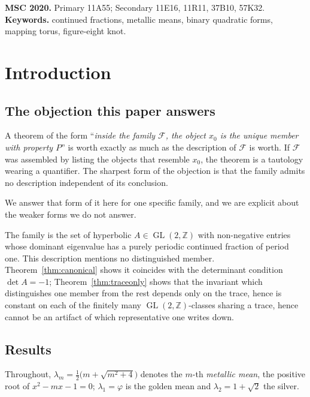 \documentclass[11pt,a4paper]{article}
\theoremstyle{definition}
\theoremstyle{remark}
\newcommand{\GL}{\operatorname{GL}}
\newcommand{\Z}{\mathbb{Z}}
\begin{document}
\medskip\noindent\small\textbf{MSC 2020.} Primary 11A55; Secondary 11E16, 11R11, 37B10, 57K32.\\
\textbf{Keywords.} continued fractions, metallic means, binary quadratic forms, mapping torus, figure-eight knot.\normalsize


\section{Introduction}\label{sec:intro}

\subsection{The objection this paper answers}

A theorem of the form ``\emph{inside the family $\mathcal{F}$, the object $x_0$ is the unique
member with property $P$}'' is worth exactly as much as the description of $\mathcal{F}$ is
worth. If $\mathcal{F}$ was assembled by listing the objects that resemble $x_0$, the theorem
is a tautology wearing a quantifier. The sharpest form of the objection is that the family
admits no description independent of its conclusion.

We answer that form of it here for one specific family, and we are explicit about the weaker
forms we do not answer.

The family is the set of hyperbolic $A\in\GL(2,\Z)$ with non-negative entries whose dominant
eigenvalue has a purely periodic continued fraction of period one. This description mentions
no distinguished member. Theorem~\ref{thm:canonical} shows it coincides with the determinant
condition $\det A=-1$; Theorem~\ref{thm:traceonly} shows that the invariant which distinguishes
one member from the rest depends only on the trace, hence is constant on each of the finitely
many $\GL(2,\Z)$-classes sharing a trace, hence cannot be an artifact of which representative
one writes down.

\subsection{Results}

Throughout, $\lambda_m=\tfrac12\bigl(m+\sqrt{m^2+4}\bigr)$ denotes the $m$-th \emph{metallic
mean}, the positive root of $x^2-mx-1=0$; $\lambda_1=\varphi$ is the golden mean and
$\lambda_2=1+\sqrt2$ the silver.
\end{document}
